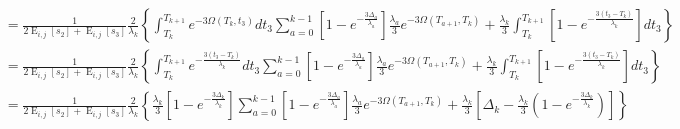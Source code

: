 \documentclass{article}
\DeclareMathOperator{\E}{E}
\begin{document}
\begin{align*}
    &=\frac{1}{2\E_{i,j}[s_2]+\E_{i,j}[s_3]}\frac{2}{\lambda_{k}}
    \left\{\int_{T_k}^{T_{k+1}}e^{-3\Omega(T_k,t_3)}dt_3
        \sum_{a=0}^{k-1}\left[1-e^{-\frac{3\Delta_a}{\lambda_a}}\right]\frac{\lambda_a}{3}
        e^{-3\Omega(T_{a+1},T_k)}+
    \frac{\lambda_{k}}{3}\int_{T_k}^{T_{k+1}}\left[1-e^{-\frac{3\left(t_3-T_{k}\right)}{\lambda_{k}}}\right]dt_3\right\}\\
    &=\frac{1}{2\E_{i,j}[s_2]+\E_{i,j}[s_3]}\frac{2}{\lambda_{k}}
    \left\{
        \int_{T_k}^{T_{k+1}}e^{-\frac{3(t_3-T_k)}{\lambda_k}}dt_3
        \sum_{a=0}^{k-1}\left[1-e^{-\frac{3\Delta_a}{\lambda_a}}\right]\frac{\lambda_a}{3}
        e^{-3\Omega(T_{a+1},T_k)}+
    \frac{\lambda_{k}}{3}\int_{T_k}^{T_{k+1}}\left[1-e^{-\frac{3\left(t_3-T_{k}\right)}{\lambda_{k}}}\right]dt_3\right\}\\
    &=\frac{1}{2\E_{i,j}[s_2]+\E_{i,j}[s_3]}\frac{2}{\lambda_{k}}
    \left\{
        \frac{\lambda_k}{3}\left[1-e^{-\frac{3\Delta_k}{\lambda_k}}\right]
        \sum_{a=0}^{k-1}\left[1-e^{-\frac{3\Delta_a}{\lambda_a}}\right]\frac{\lambda_a}{3}
        e^{-3\Omega(T_{a+1},T_k)}+
    \frac{\lambda_{k}}{3}
    \left[\Delta_k-\frac{\lambda_k}{3}\left(1-e^{-\frac{3\Delta_k}{\lambda_k}}\right)\right]\right\}
    \\[1em]
\end{align*}
\end{document}
